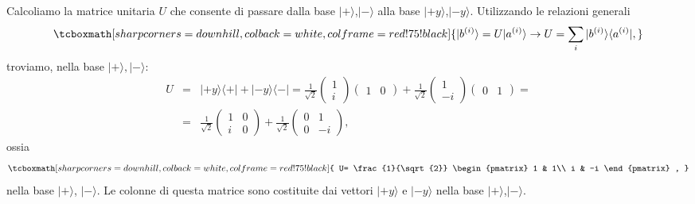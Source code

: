 \documentclass[a4paper,12pt,oneside]{book}
\begin{document}
Calcoliamo la matrice unitaria $U$ che consente di passare dalla base $| + \rangle $,$| - \rangle $ alla base $| +y \rangle $,$| -y \rangle$. Utilizzando le relazioni generali
		\begin{equation}
		\tcboxmath[sharp corners=downhill ,colback=white,colframe=red!75!black]{
			| b^{(i)}\rangle =U| a^{(i)} \rangle \rightarrow U = \sum \limits_i | b^{(i)}\rangle \langle a^{(i)}| ,
			}
	\end{equation}
troviamo, nella base $| + \rangle,| - \rangle$:
	\begin{eqnarray}
		U &=& | +y \rangle \langle + | + |-y \rangle \langle - |=
		\frac{1}{\sqrt{2}}
		\begin{pmatrix}
		1\\
		i
		\end{pmatrix}
		\begin{pmatrix}
		1 & 0
		\end{pmatrix}+
		\frac{1}{\sqrt{2}}
		\begin{pmatrix}
		1\\
		-i
		\end{pmatrix}
		\begin{pmatrix}
		0 & 1
		\end{pmatrix}= \nonumber \\
		&=&\frac{1}{\sqrt{2}}
		\begin{pmatrix}
		1 & 0\\
		i & 0
		\end{pmatrix}+
		\frac{1}{\sqrt{2}}
		\begin{pmatrix}
		0 & 1\\
		0 & -i
		\end{pmatrix} ,
	\end{eqnarray}
ossia
	\begin{equation}
		\tcboxmath[sharp corners=downhill ,colback=white,colframe=red!75!black]{
			U= \frac{1}{\sqrt{2}}
			\begin{pmatrix}
			1 & 1\\
			i & -i
			\end{pmatrix} ,
			}
	\end{equation}
nella base $| + \rangle $, $| - \rangle $. Le colonne di questa matrice sono costituite dai vettori $| +y \rangle $ e $| -y \rangle $ nella base $| + \rangle $,$| - \rangle $.\\
\end{document}
